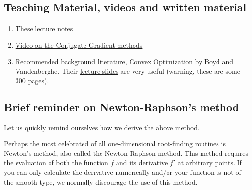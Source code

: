 \documentclass[%
oneside,                 %
final,                   %
10pt]{article}
\begin{document}
\noindent



\subsection*{Teaching Material, videos and written material}

\paragraph{}
\begin{enumerate}
\item These lecture notes

\item \href{{https://www.youtube.com/watch?v=eAYohMUpPMA&ab_channel=TomCarlone}}{Video on the Conjugate Gradient methods}

\item Recommended background literature, \href{{https://web.stanford.edu/~boyd/cvxbook/}}{Convex Optimization} by Boyd and Vandenberghe. Their \href{{https://web.stanford.edu/~boyd/cvxbook/bv_cvxslides.pdf}}{lecture slides} are very useful (warning, these are some 300 pages).
\end{enumerate}

\noindent



\subsection*{Brief reminder on Newton-Raphson's method}

Let us quickly remind ourselves how we derive the above method.

Perhaps the most celebrated of all one-dimensional root-finding
routines is Newton's method, also called the Newton-Raphson
method. This method  requires the evaluation of both the
function $f$ and its derivative $f'$ at arbitrary points. 
If you can only calculate the derivative
numerically and/or your function is not of the smooth type, we
normally discourage the use of this method.
\end{document}
